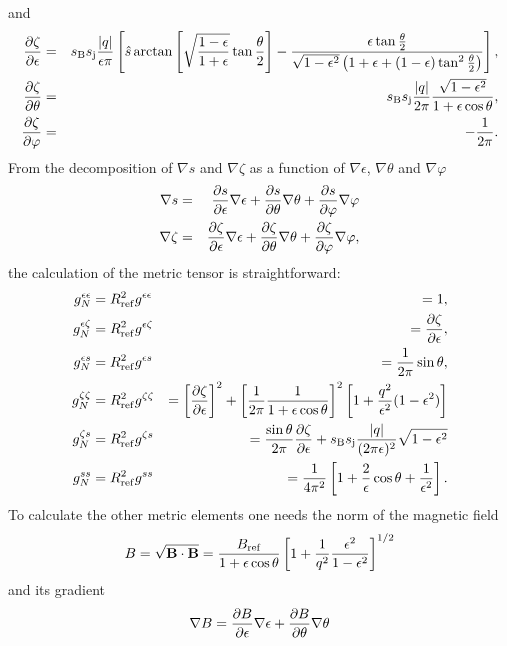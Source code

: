 and
\begin{eqnarray}
 \frac{\partial \zeta}{\partial \epsilon} &=& s_{\mathrm{B}}s_{\mathrm{j}}\frac{|q|}{\epsilon\pi}\left[ \hat{s}\arctan\left[ \sqrt{\frac{1-\epsilon}{1+\epsilon}}\tan \frac{\theta}{2}\right] -
\frac{\epsilon\tan\frac{\theta}{2}}{\sqrt{1-\epsilon^2}\left(1+\epsilon+(1-\epsilon)\tan^2\frac{\theta}{2}\right)} \right], \\
 \frac{\partial \zeta}{\partial \theta} &=& s_{\mathrm{B}}s_{\mathrm{j}}\frac{|q|}{2\pi}\frac{\sqrt{1-\epsilon^2}}{1+\epsilon\cos\theta},\\
 \frac{\partial \zeta}{\partial \varphi} &=& -\frac{1}{2\pi}.
\end{eqnarray}
From the decomposition of $\nabla s$ and $\nabla \zeta$ as a function of $\nabla \epsilon$, $\nabla \theta$ and $\nabla\varphi$
\begin{eqnarray}
 \nabla s &=& \frac{\partial s}{\partial \epsilon} \nabla\epsilon +  \frac{\partial s}{\partial \theta} \nabla\theta +  \frac{\partial s}{\partial \varphi} \nabla\varphi \\
 \nabla \zeta &=& \frac{\partial \zeta}{\partial \epsilon} \nabla\epsilon +  \frac{\partial \zeta}{\partial \theta} \nabla\theta +  \frac{\partial \zeta}{\partial \varphi} \nabla\varphi ,
\end{eqnarray}
the calculation of the metric tensor is straightforward:
\begin{eqnarray}
 g^{\epsilon\epsilon}_N &= R_{\mathrm{ref}}^2 g^{\epsilon\epsilon} &= 1,\\
 g^{\epsilon\zeta}_N &= R_{\mathrm{ref}}^2 g^{\epsilon\zeta} &= \frac{\partial \zeta}{\partial \epsilon},\\
 g^{\epsilon s}_N &=R_{\mathrm{ref}}^2 g^{\epsilon s} &= \frac{1}{2\pi}\sin\theta,\\
 g^{\zeta\zeta}_N &= R_{\mathrm{ref}}^2 g^{\zeta\zeta} &= \left[\frac{\partial \zeta}{\partial \epsilon}\right]^2 + \left[\frac{1}{2\pi}\frac{1}{1+\epsilon\cos\theta} \right]^2
\left[1+\frac{q^2}{\epsilon^2}(1-\epsilon^2)\right]\\
 g^{\zeta s}_N &= R_{\mathrm{ref}}^2 g^{\zeta s} &= \frac{\sin\theta}{2\pi}\frac{\partial \zeta}{\partial \epsilon} + s_{\mathrm{B}}s_{\mathrm{j}}\frac{|q|}{(2\pi\epsilon)^2}\sqrt{1-\epsilon^2}\\
 g^{s s}_N &= R_{\mathrm{ref}}^2 g^{s s} &= \frac{1}{4\pi^2}\left[ 1 + \frac{2}{\epsilon}\cos\theta + \frac{1}{\epsilon^2}\right].
\end{eqnarray}
To calculate the other metric elements one needs the norm of the magnetic field
\begin{equation}
 B=\sqrt{\mathbf{B}\cdot\mathbf{B}}=\frac{B_{\mathrm{ref}}}{1+\epsilon\cos\theta}\left[ 1+ \frac{1}{q^2}\frac{\epsilon^2}{1-\epsilon^2} \right]^{1/2}
\end{equation}
and its gradient
\begin{equation}
 \nabla B = \frac{\partial B}{\partial \epsilon} \nabla \epsilon + \frac{\partial B}{\partial \theta} \nabla \theta
\end{equation}
